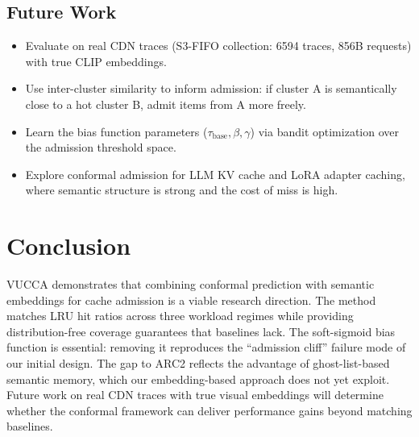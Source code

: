 \documentclass[11pt,letterpaper]{article}
\begin{document}
\subsection{Future Work}

\begin{itemize}
  \item Evaluate on real CDN traces (S3-FIFO collection: 6594 traces, 856B requests) with true CLIP embeddings.
  \item Use inter-cluster similarity to inform admission: if cluster A is semantically close to a hot cluster B, admit items from A more freely.
  \item Learn the bias function parameters ($\tau_{\text{base}}, \beta, \gamma$) via bandit optimization over the admission threshold space.
  \item Explore conformal admission for LLM KV cache and LoRA adapter caching, where semantic structure is strong and the cost of miss is high.
\end{itemize}

\section{Conclusion}

VUCCA demonstrates that combining conformal prediction with semantic embeddings for cache admission is a viable research direction. The method matches LRU hit ratios across three workload regimes while providing distribution-free coverage guarantees that baselines lack. The soft-sigmoid bias function is essential: removing it reproduces the ``admission cliff'' failure mode of our initial design. The gap to ARC2 reflects the advantage of ghost-list-based semantic memory, which our embedding-based approach does not yet exploit. Future work on real CDN traces with true visual embeddings will determine whether the conformal framework can deliver performance gains beyond matching baselines.



\end{document}
